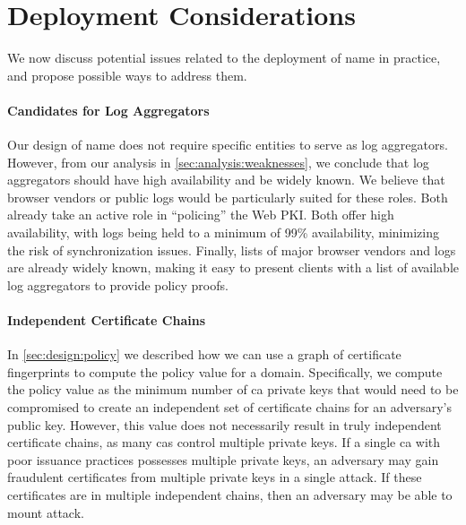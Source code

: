 \section{Deployment Considerations}
\label{sec:discussion}

We now discuss potential issues related to the deployment of \ac{name} in
practice, and propose possible ways to address them.

\paragraph{Candidates for Log Aggregators}
Our design of \ac{name} does not require specific entities to serve as log
aggregators. However, from our analysis in \autoref{sec:analysis:weaknesses},
we conclude that log aggregators should have high availability and be widely
known. We believe that browser vendors or public logs would be particularly
suited for these roles. Both already take an active role in ``policing'' the
Web PKI. 
Both offer high availability, with logs being held to a minimum of 99\%
availability, minimizing the risk of synchronization issues. Finally, lists
of major browser vendors and logs are already widely known, making it easy to
present clients with a list of available log aggregators to provide policy
proofs.

\paragraph{Independent Certificate Chains}
In \autoref{sec:design:policy} we described how we can use a graph of certificate
fingerprints to compute the policy value for a domain. Specifically, we compute
the policy value as the minimum number of \ac{ca} private keys that would need
to be compromised to create an independent set of certificate chains for an
adversary's public key. However, this value does not necessarily result in truly
independent certificate chains, as many \acp{ca} control multiple private keys.
If a single \ac{ca} with poor issuance practices possesses multiple private
keys, an adversary may gain fraudulent certificates from multiple private keys
in a single attack. If these certificates are in multiple independent chains,
then an adversary may be able to mount  attack.

